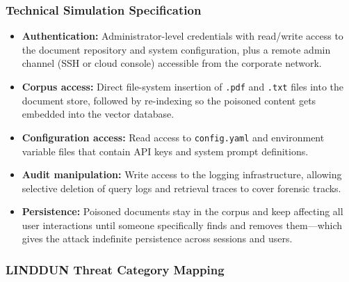 \documentclass[11pt,a4paper]{report}
\begin{document}
\subsubsection{Technical Simulation Specification}

\begin{prosebox}
\begin{itemize}[leftmargin=1.4em, itemsep=3pt]
  \item \textbf{Authentication:} Administrator-level credentials with
        read/write access to the document repository and system configuration,
        plus a remote admin channel (SSH or cloud console) accessible from
        the corporate network.
  \item \textbf{Corpus access:} Direct file-system insertion of \texttt{.pdf}
        and \texttt{.txt} files into the document store, followed by
        re-indexing so the poisoned content gets embedded into the vector database.
  \item \textbf{Configuration access:} Read access to \texttt{config.yaml}
        and environment variable files that contain API keys and system prompt
        definitions.
  \item \textbf{Audit manipulation:} Write access to the logging
        infrastructure, allowing selective deletion of query logs and
        retrieval traces to cover forensic tracks.
  \item \textbf{Persistence:} Poisoned documents stay in the corpus and
        keep affecting all user interactions until someone specifically finds
        and removes them---which gives the attack indefinite persistence
        across sessions and users.
\end{itemize}
\end{prosebox}

\subsubsection{LINDDUN Threat Category Mapping}
\end{document}
